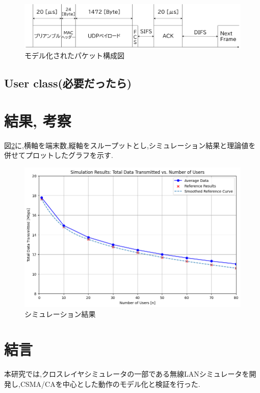 \documentclass[a4paper, 10pt]{ltjsarticle}
\begin{document}
\begin{figure}[H]
  \centering
  \includegraphics[width=1\columnwidth]{./assets/packet.png}
  \caption{モデル化されたパケット構成図}
  \label{packet}
\end{figure}


\subsection{User class(必要だったら)}


\section{結果, 考察}
図\ref{fig:simulation-result}に,横軸を端末数,縦軸をスループットとし,シミュレーション結果と理論値を併せてプロットしたグラフを示す.


\begin{figure}[H]
  \centering
  \includegraphics[width=1\columnwidth]{./assets/g3.png}
  \caption{シミュレーション結果}
  \label{fig:simulation-result}
\end{figure}


\section{結言}
本研究では,クロスレイヤシミュレータの一部である無線LANシミュレータを開発し,CSMA/CAを中心とした動作のモデル化と検証を行った.
\end{document}
